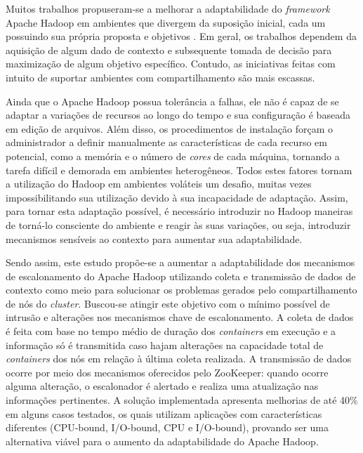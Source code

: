 Muitos trabalhos propuseram-se a melhorar a adaptabilidade do \textit{framework} Apache Hadoop em ambientes que divergem da suposição inicial, cada um possuindo sua própria proposta e objetivos \cite{Kumar2012} \cite{Zaharia2008} \cite{Rasooli2012} \cite{Sandholm2010} \cite{3PGCIC}. Em geral, os trabalhos dependem da aquisição de algum dado de contexto e subsequente tomada de decisão para maximização de algum objetivo específico. Contudo, as iniciativas feitas com intuito de suportar ambientes com compartilhamento são mais escassas.

Ainda que o Apache Hadoop possua tolerância a falhas, ele não é capaz de se adaptar a variações de recursos ao longo do tempo e sua configuração é baseada em edição de arquivos. Além disso, os procedimentos de instalação forçam o administrador a definir manualmente as características de cada recurso em potencial, como a memória e o número de \textit{cores} de cada máquina, tornando a tarefa difícil e demorada em ambientes heterogêneos. Todos estes fatores tornam a utilização do Hadoop em ambientes voláteis um desafio, muitas vezes impossibilitando sua utilização devido à sua incapacidade de adaptação. Assim, para tornar esta adaptação possível, é necessário introduzir no Hadoop maneiras de torná-lo consciente do ambiente e reagir às suas variações, ou seja, introduzir mecanismos sensíveis ao contexto para aumentar sua adaptabilidade.

Sendo assim, este estudo propõe-se a aumentar a adaptabilidade dos mecanismos de escalonamento do Apache Hadoop utilizando coleta e transmissão de dados de contexto como meio para solucionar os problemas gerados pelo compartilhamento de nós do \textit{cluster}. Buscou-se atingir este objetivo com o mínimo possível de intrusão e alterações nos mecanismos chave de escalonamento. A coleta de dados é feita com base no tempo médio de duração dos \textit{containers} em execução e a informação só é transmitida caso hajam alterações na capacidade total de \textit{containers} dos nós em relação à última coleta realizada. A transmissão de dados ocorre por meio dos mecanismos oferecidos pelo ZooKeeper: quando ocorre alguma alteração, o escalonador é alertado e realiza uma atualização nas informações pertinentes. A solução implementada apresenta melhorias de até 40\% em alguns casos testados, os quais utilizam aplicações com características diferentes (CPU-bound, I/O-bound, CPU e I/O-bound), provando ser uma alternativa viável para o aumento da adaptabilidade do Apache Hadoop.

